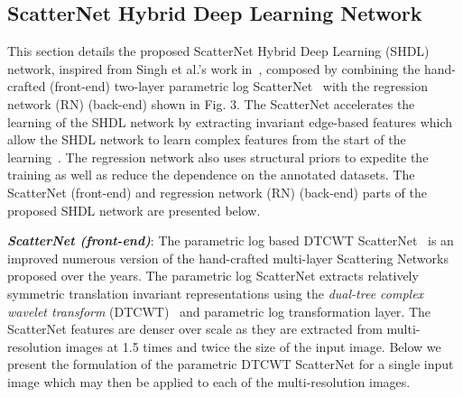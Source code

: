 \documentclass[10pt,twocolumn,letterpaper]{article}
\begin{document}
\subsection{ScatterNet Hybrid Deep Learning Network}
This section details the proposed ScatterNet Hybrid Deep Learning (SHDL) network, inspired from Singh et al.'s work in~\cite{eff,shdl2017,tsshdl, GSHDL}, composed by combining the hand-crafted (front-end) two-layer parametric log ScatterNet~\cite{singh} with the regression network (RN) (back-end)  shown in Fig. 3. The ScatterNet accelerates the learning of the SHDL network by extracting invariant edge-based features which allow the SHDL network to learn complex features from the start of the learning~\cite{eff}. The regression network also uses structural priors to expedite the training as well as reduce the dependence on the annotated datasets. The ScatterNet (front-end) and regression network (RN) (back-end) parts of the proposed SHDL network are presented below.

\vspace{0.5mm}
\textbf{\textit{ScatterNet (front-end)}}: The parametric log based DTCWT ScatterNet~\cite{singh} is an improved numerous version of the hand-crafted multi-layer Scattering Networks~\cite{Jbruna2013,ima,eccv} proposed over the years. The parametric log ScatterNet extracts relatively symmetric translation invariant representations using the \textit{dual-tree complex wavelet transform} (DTCWT)~\cite{Kingsbury1998} and parametric log transformation layer. The ScatterNet features are denser over scale as they are extracted from multi-resolution images at 1.5 times and twice the size of the input image. Below we present the formulation of the parametric DTCWT ScatterNet for a single input image which may then be applied to each of the multi-resolution images.
\end{document}
